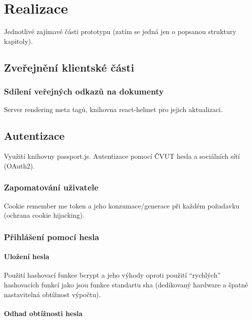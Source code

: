 
\chapter{Realizace}\label{ch:realizace}

Jednotlivé zajímavé části prototypu (zatím se jedná jen o popsanou struktury kapitoly).

\section{Zveřejnění klientské části}\label{sec:zveřejněníKlientskéČásti}

\subsection{Sdílení veřejných odkazů na dokumenty}

Server rendering meta tagů, knihovna react-helmet pro jejich aktualizaci.

\section{Autentizace}

Využití knihovny passport.js.
Autentizace pomocí ČVUT hesla a sociálních sítí (OAuth2).

\subsection{Zapomatování uživatele}

Cookie remember me token a jeho konzumace/generace při každém požadavku (ochrana cookie hijacking).

\subsection{Přihlášení pomocí hesla}

\subsubsection{Uložení hesla}

Použití hashovací funkce bcrypt a jeho výhody oproti použití \enquote{rychlých} hashovacích funkcí jako jsou funkce standartu sha (dedikovaný hardware a špatně nastavitelná obtížnost výpočtu).

\subsubsection{Odhad obtížnosti hesla}

